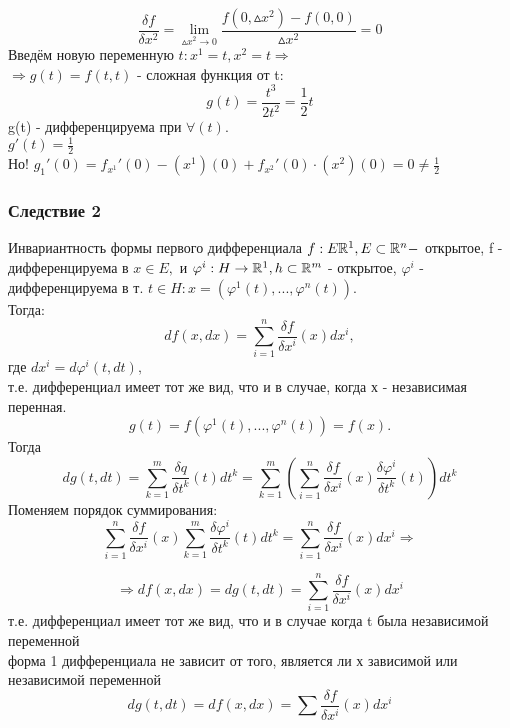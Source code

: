 $$
\frac{\delta f}{\delta x^2} = \lim_{\vartriangle x^2\to 0}\frac{f(0,\vartriangle x^2) - f(0,0)}{\vartriangle x^2}=0
$$
Введём новую переменную $t: x^1=t, x^2=t\Rightarrow$
\\
$\Rightarrow g(t)=f(t,t)$ - сложная функция от t:
$$
g(t) = \frac{t^3}{2t^2} = \frac{1}{2}t
$$
g(t) - дифференцируема при $\forall(t).$
\\
$g'(t) = \frac{1}{2}$
\\
Но! $g_1'(0)=f_{x^1}'(0)-(x^1)(0)+f_{x^2}'(0)\cdot(x^2)(0) = 0 \ne \frac{1}{2}$

\subsubsection{Следствие 2}
Инвариантность формы первого дифференциала $f:E\mathbb{R}^1, E\subset\mathbb{R}^n - $ открытое, f - дифференцируема в $x\in E,$ и $\varphi^i:H\to\mathbb{R}^1,h\subset\mathbb{R}^m$ - открытое, $\varphi^i$ - дифференцируема в т. $t\in H: x =(\varphi^1(t),...,\varphi^n(t))$.
\\
Тогда:
$$
df(x,dx) = \sum_{i=1}^{n}\frac{\delta f}{\delta x^i}(x)dx^i,
$$
где $dx^i = d\varphi^i(t,dt),$
\\
т.е. дифференциал имеет тот же вид, что и в случае, когда х - независимая перенная.
\dokvo
$$g(t) = f(\varphi^1(t),...,\varphi^n(t)) = f(x).$$
Тогда
$$
dg(t,dt) = \sum_{k=1}^{m}\frac{\delta q}{\delta t^k}(t)dt^k = \sum_{k=1}^{m}(\sum_{i=1}^{n}\frac{\delta f}{\delta x^i}(x)\frac{\delta\varphi^i}{\delta t^k}(t))dt^k
$$
Поменяем порядок суммирования:
$$
\sum_{i=1}^{n}\frac{\delta f}{\delta x^i}(x)\sum_{k=1}^{m}\frac{\delta\varphi^i}{\delta t^k}(t)dt^k = \sum_{i=1}^{n}\frac{\delta f}{\delta x^i}(x)dx^i \Rightarrow
$$

$$
\Rightarrow df(x,dx) = dg(t,dt) = \sum_{i=1}^{n}\frac{\delta f}{\delta x^i}(x)dx^i
$$
т.е. дифференциал имеет тот же вид, что и в случае когда t была независимой переменной 
\dokno
\\
форма 1 дифференциала не зависит от того, является ли х зависимой или независимой переменной
$$
dg(t,dt)=df(x,dx)=\sum \frac{\delta f}{\delta x^i}(x)dx^i
$$



